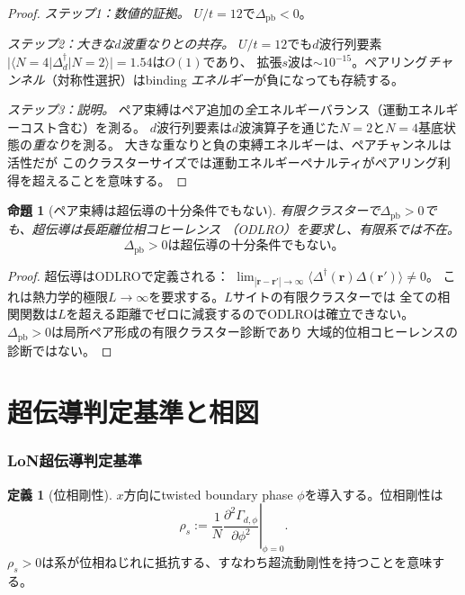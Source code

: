 \documentclass[12pt]{article}
\theoremstyle{plain}
\newtheorem{proposition}[theorem]{命題}
\theoremstyle{definition}
\newtheorem{definition}[theorem]{定義}
\numberwithin{equation}{section}
\begin{document}
\begin{proof}
\emph{ステップ1：数値的証拠。}
$U/t=12$で$\Delta_{\mathrm{pb}}<0$。

\emph{ステップ2：大きな$d$波重なりとの共存。}
$U/t=12$でも$d$波行列要素$|\langle N\!=\!4|\Delta_d^\dagger|N\!=\!2\rangle|=1.54$は$O(1)$であり、
拡張$s$波は$\sim10^{-15}$。ペアリング\emph{チャンネル}（対称性選択）はbinding
\emph{エネルギー}が負になっても存続する。

\emph{ステップ3：説明。}
ペア束縛はペア追加の\emph{全}エネルギーバランス（運動エネルギーコスト含む）を測る。
$d$波行列要素は$d$波演算子を通じた$N=2$と$N=4$基底状態の\emph{重なり}を測る。
大きな重なりと負の束縛エネルギーは、ペアチャンネルは活性だが
このクラスターサイズでは運動エネルギーペナルティがペアリング利得を超えることを意味する。
\end{proof}

\begin{proposition}[ペア束縛は超伝導の十分条件でもない]\label{prop:notsuff}
有限クラスターで$\Delta_{\mathrm{pb}}>0$でも、超伝導は長距離位相コヒーレンス
（ODLRO）を要求し、有限系では不在。
\begin{equation}
\boxed{\Delta_{\mathrm{pb}}>0\text{は超伝導の十分条件でもない。}}
\end{equation}
\end{proposition}

\begin{proof}
超伝導はODLROで定義される：
$\lim_{|\bm{r}-\bm{r}'|\to\infty}
\langle\Delta^\dagger(\bm{r})\Delta(\bm{r}')\rangle\neq 0$。
これは熱力学的極限$L\to\infty$を要求する。$L$サイトの有限クラスターでは
全ての相関関数は$L$を超える距離でゼロに減衰するのでODLROは確立できない。
$\Delta_{\mathrm{pb}}>0$は局所ペア形成の有限クラスター診断であり
大域的位相コヒーレンスの診断ではない。
\end{proof}


\part{超伝導判定基準と相図}

\section{LoN超伝導判定基準}\label{sec:SCcriterion}

\begin{definition}[位相剛性]\label{def:stiffness}
$x$方向にtwisted boundary phase $\phi$を導入する。位相剛性は
\begin{equation}
\boxed{\rho_s := \frac{1}{N}\left.\frac{\partial^2\Gamma_{d,\phi}}
{\partial\phi^2}\right|_{\phi=0}.}
\end{equation}
$\rho_s>0$は系が位相ねじれに抵抗する、すなわち超流動剛性を持つことを意味する。
\end{definition}
\end{document}

